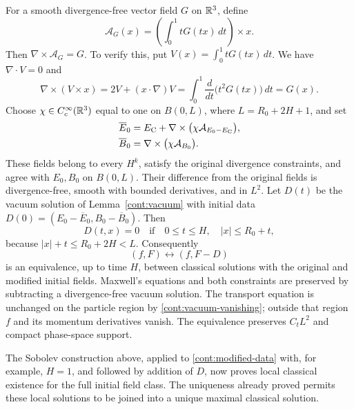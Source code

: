 For a smooth divergence-free vector field $G$ on $\mathbb R^3$, define
\begin{equation}\label{cont:potential}
 \mathcal A_G(x)=\left(\int_0^1 tG(tx)\,dt\right)\times x.
\end{equation}
Then $\nabla\times\mathcal A_G=G$.  To verify this, put
$V(x)=\int_0^1tG(tx)\,dt$.  We have $\nabla\cdot V=0$ and
\[
 \nabla\times(V\times x)=2V+(x\cdot\nabla)V
 =\int_0^1\frac{d}{dt}\bigl(t^2G(tx)\bigr)\,dt=G(x).
\]
Choose $\chi\in C_c^\infty(\mathbb R^3)$ equal to one on
$B(0,L)$, where $L=R_0+2H+1$, and set
\begin{equation}\label{cont:modified-data}
 \begin{split}
 \overline E_0&=E_{\rm C}+
     \nabla\times\bigl(\chi\mathcal A_{E_0-E_{\rm C}}\bigr),\\
 \overline B_0&=\nabla\times\bigl(\chi\mathcal A_{B_0}\bigr).
 \end{split}
\end{equation}
These fields belong to every $H^k$, satisfy the original divergence
constraints, and agree with $E_0,B_0$ on $B(0,L)$.
Their difference from the original fields is divergence-free,
smooth with bounded derivatives, and in $L^2$.
Let $D(t)$ be the vacuum solution of Lemma~\ref{cont:vacuum} with
initial data
$D(0)=(E_0-\overline E_0,B_0-\overline B_0)$.
Then
\begin{equation}\label{cont:vacuum-vanishing}
 D(t,x)=0\quad\text{if}\quad
 0\le t\le H,\quad |x|\le R_0+t,
\end{equation}
because $|x|+t\le R_0+2H<L$.
Consequently
\begin{equation}\label{cont:field-equivalence}
 (f,F)\longleftrightarrow(f,F-D)
\end{equation}
is an equivalence, up to time $H$, between classical solutions with
the original and modified initial fields.
Maxwell's equations and both constraints are preserved by subtracting
a divergence-free vacuum solution.  The transport equation is
unchanged on the particle region by \eqref{cont:vacuum-vanishing};
outside that region $f$ and its momentum derivatives vanish.
The equivalence preserves $C_tL^2$ and compact phase-space support.

The Sobolev construction above, applied to \eqref{cont:modified-data}
with, for example, $H=1$, and followed by addition of $D$, now proves
local classical existence for the full initial field class.
The uniqueness already proved permits these local solutions to be
joined into a unique maximal classical solution.

